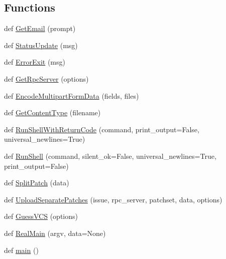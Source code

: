 \subsection*{Functions}
\begin{DoxyCompactItemize}
\item 
def \hyperlink{namespaceupload_a4f169469a6d43221ebd38cfd546484e1}{Get\+Email} (prompt)
\item 
def \hyperlink{namespaceupload_a79ce84c196c018f3b0c7ff7a9b626b58}{Status\+Update} (msg)
\item 
def \hyperlink{namespaceupload_adea53186a1d73e92cc839b7c35c2c044}{Error\+Exit} (msg)
\item 
def \hyperlink{namespaceupload_a1dadef480a702dbc5d0fb66203b9abe7}{Get\+Rpc\+Server} (options)
\item 
def \hyperlink{namespaceupload_ae12985a2c860c124c502dd2099b702eb}{Encode\+Multipart\+Form\+Data} (fields, files)
\item 
def \hyperlink{namespaceupload_a753a004706d964335ad218628e07b063}{Get\+Content\+Type} (filename)
\item 
def \hyperlink{namespaceupload_afa542d3a5a4f4fce174a1c23644a9204}{Run\+Shell\+With\+Return\+Code} (command, print\+\_\+output=False, universal\+\_\+newlines=True)
\item 
def \hyperlink{namespaceupload_adddc423c49132e8879cbb25d6be2cf11}{Run\+Shell} (command, silent\+\_\+ok=False, universal\+\_\+newlines=True, print\+\_\+output=False)
\item 
def \hyperlink{namespaceupload_a9dd260785ca4cc97e245234811ef1949}{Split\+Patch} (data)
\item 
def \hyperlink{namespaceupload_a7ec83cb7f7bfb9109c19b6f91552b3ee}{Upload\+Separate\+Patches} (issue, rpc\+\_\+server, patchset, data, options)
\item 
def \hyperlink{namespaceupload_a31390568253accd22ee51861eaeb99bd}{Guess\+V\+CS} (options)
\item 
def \hyperlink{namespaceupload_ad6226af96c9f1905602b8002bd5de952}{Real\+Main} (argv, data=None)
\item 
def \hyperlink{namespaceupload_aef3fcf7a8d77d13ba75adbf58b6c43ee}{main} ()
\end{DoxyCompactItemize}
